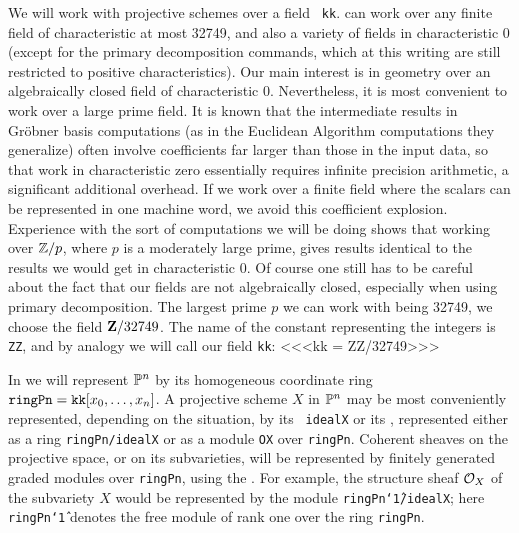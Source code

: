 We will work with projective schemes over a field {\tt
kk}. \Mtwo can work over any finite field of characteristic at most
32749, and also a variety of fields in characteristic 0 (except for
the primary decomposition commands, which at this writing are still
restricted to positive characteristics). Our main interest is in
geometry over an algebraically closed field of characteristic
0. Nevertheless, it is most convenient to work over a large prime
{}field. 
It is known that the intermediate results in Gr\"obner basis
computations (as in the Euclidean Algorithm computations they
generalize) often involve coefficients far larger than those in the
input data, so that work in characteristic zero essentially requires
infinite precision arithmetic, a significant additional overhead. If
we work over a finite field where the scalars can be represented in
one machine word, we avoid this coefficient explosion. Experience with
the sort of computations we will be doing shows that working over
$\Z/p$, where $p$ is a moderately large prime, gives results
identical to the results we would get in characteristic 0.
Of course one still
has to be careful about the fact that our fields are not
algebraically closed, especially when using primary
decomposition. The largest prime $p$ we can work with being 32749, we
choose the field ${\bf Z}/32749$. 
The name of the \Mtwo constant representing the
integers is {\tt ZZ}, and by analogy we will call our field {\tt kk}:
<<<kk = ZZ/32749>>>

In \Mtwo we will represent  $\P^n$ by its
homogeneous coordinate ring ${\tt ringPn} = {\tt kk}[x_0,\dots,x_n]$.  A
projective scheme $X$ in $\P^n$ may be most conveniently
represented, depending on the situation, by its  {\tt
idealX} or its , represented either as a
ring {\tt ringPn/idealX} or as a module {\tt OX} over {\tt ringPn}.
Coherent sheaves on the projective space, or on its subvarieties, will
be represented by finitely generated
graded
modules over {\tt ringPn}, using the
.
For example, the structure sheaf $\cO_X$
of the subvariety $X$ would be represented by the module 
{\tt ringPn\char`\^1/idealX}; here {\tt ringPn\char`\^1}
denotes the free module of rank one over the ring
{\tt ringPn}.

